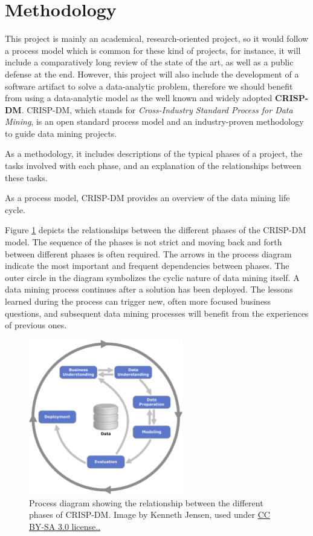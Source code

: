 \section{Methodology}

This project is mainly an academical, research-oriented project, so it would follow a process model which is common for these kind of projects, for instance, it will include a comparatively long review of the state of the art, as well as a public defense at the end. However, this project will also include the development of a software artifact to solve a data-analytic problem, therefore we should benefit from using a data-analytic model as the well known and widely adopted \textbf{CRISP-DM}. CRISP-DM, which stands for \textit{Cross-Industry Standard Process for Data Mining}, is an open standard process model and an industry-proven methodology to guide data mining projects.

As a methodology, it includes descriptions of the typical phases of a project, the tasks involved with each phase, and an explanation of the relationships between these tasks.

As a process model, CRISP-DM provides an overview of the data mining life cycle.

Figure \ref{fig:crisp-dm} depicts the relationships between the different phases of the CRISP-DM model. The sequence of the phases is not strict and moving back and forth between different phases is often required. The arrows in the process diagram indicate the most important and frequent dependencies between phases. The outer circle in the diagram symbolizes the cyclic nature of data mining itself. A data mining process continues after a solution has been deployed. The lessons learned during the process can trigger new, often more focused business questions, and subsequent data mining processes will benefit from the experiences of previous ones.

\begin{figure}[hpt]
	\centering
	\includegraphics[width=0.6\textwidth]{figs/ch1/crisp-dm.png}
	\caption{Process diagram showing the relationship between the different phases of CRISP-DM. Image by Kenneth Jensen, used under \href{https://creativecommons.org/licenses/by/2.0/}{CC BY-SA 3.0 license..}}
	\label{fig:crisp-dm}
\end{figure}

